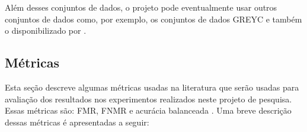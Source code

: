Além desses conjuntos de dados, o projeto pode eventualmente usar outros conjuntos de dados como, por exemplo, os conjuntos de dados GREYC \cite{giot2009benchmark} e também o disponibilizado por .


\subsection{Métricas}
\label{sec:metricas}

Esta seção descreve algumas métricas usadas na literatura que serão usadas para avaliação dos resultados nos experimentos realizados neste projeto de pesquisa. Essas métricas são: FMR, FNMR e acurácia balanceada \cite{Precise2014, Ferlini2021eargate}. Uma breve descrição dessas métricas é apresentadas a seguir:

